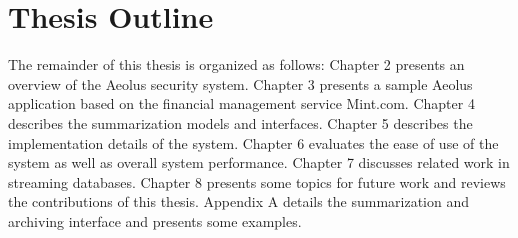 



\section*{Thesis Outline}

The remainder of this thesis is organized as follows: Chapter 2 presents an overview of the Aeolus security system. Chapter 3 presents a sample Aeolus application based on the financial management service Mint.com. Chapter 4 describes the summarization models and interfaces. Chapter 5 describes the implementation details of the system. Chapter 6 evaluates the ease of use of the system as well as overall system performance. Chapter 7 discusses related work in streaming databases. Chapter 8 presents some topics for future work and reviews the contributions of this thesis. Appendix A details the summarization and archiving interface and presents some examples.
